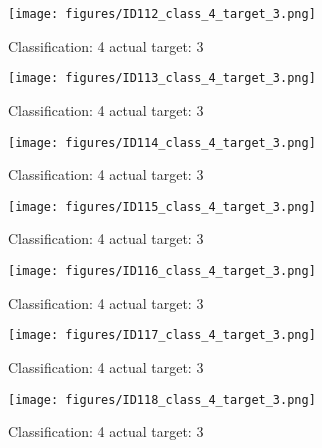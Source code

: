 \begin{figure}[h!]
\begin{center}
\texttt{[image: figures/ID112\_class\_4\_target\_3.png]}
\end{center}
\caption{ Classification: 4 actual target: 3}
\label{fig:ID112_class_4_target_3}
\end{figure}
\begin{figure}[h!]
\begin{center}
\texttt{[image: figures/ID113\_class\_4\_target\_3.png]}
\end{center}
\caption{ Classification: 4 actual target: 3}
\label{fig:ID113_class_4_target_3}
\end{figure}
\begin{figure}[h!]
\begin{center}
\texttt{[image: figures/ID114\_class\_4\_target\_3.png]}
\end{center}
\caption{ Classification: 4 actual target: 3}
\label{fig:ID114_class_4_target_3}
\end{figure}
\begin{figure}[h!]
\begin{center}
\texttt{[image: figures/ID115\_class\_4\_target\_3.png]}
\end{center}
\caption{ Classification: 4 actual target: 3}
\label{fig:ID115_class_4_target_3}
\end{figure}
\begin{figure}[h!]
\begin{center}
\texttt{[image: figures/ID116\_class\_4\_target\_3.png]}
\end{center}
\caption{ Classification: 4 actual target: 3}
\label{fig:ID116_class_4_target_3}
\end{figure}
\begin{figure}[h!]
\begin{center}
\texttt{[image: figures/ID117\_class\_4\_target\_3.png]}
\end{center}
\caption{ Classification: 4 actual target: 3}
\label{fig:ID117_class_4_target_3}
\end{figure}
\begin{figure}[h!]
\begin{center}
\texttt{[image: figures/ID118\_class\_4\_target\_3.png]}
\end{center}
\caption{ Classification: 4 actual target: 3}
\label{fig:ID118_class_4_target_3}
\end{figure}
